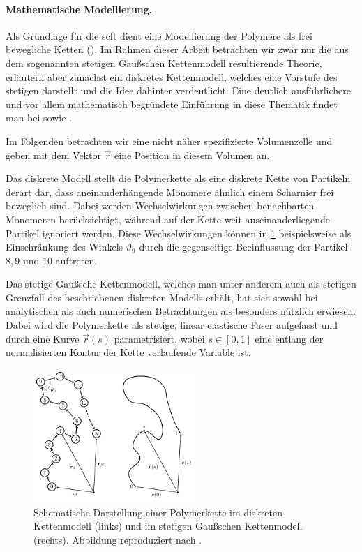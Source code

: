 \documentclass[../main.tex]{subfiles}
\begin{document}
\paragraph{Mathematische Modellierung.} %

Als Grundlage für die \acl{scft} dient eine Modellierung der Polymere als frei bewegliche Ketten ().
Im Rahmen dieser Arbeit betrachten wir zwar nur die aus dem sogenannten stetigen Gaußschen Kettenmodell resultierende Theorie, erläutern aber zunächst ein diskretes Kettenmodell, welches eine Vorstufe des stetigen darstellt und die Idee dahinter verdeutlicht.
Eine deutlich ausführlichere und vor allem mathematisch begründete Einführung in diese Thematik findet man bei \textcites[Chapter 2]{Fredrickson:2006th} sowie \textcite{rubinstein2003polymer}.

Im Folgenden betrachten wir eine nicht näher spezifizierte Volumenzelle und geben mit dem Vektor $\vec{r}$ eine Position in diesem Volumen an.

Das diskrete Modell stellt die Polymerkette als eine diskrete Kette von Partikeln derart dar, dass aneinanderhängende Monomere ähnlich einem Scharnier frei beweglich sind.
Dabei werden Wechselwirkungen zwischen benachbarten Monomeren berücksichtigt, während auf der Kette weit auseinanderliegende Partikel ignoriert werden.
Diese Wechselwirkungen können in \cref{figure:kettenmodelle} beispielsweise als Einschränkung des Winkels $\vartheta_9$ durch die gegenseitige Beeinflussung der Partikel $8, 9$ und $10$ auftreten.

Das stetige Gaußsche Kettenmodell, welches man unter anderem auch als stetigen Grenzfall des beschriebenen diskreten Modells erhält, hat sich sowohl bei analytischen als auch numerischen Betrachtungen als besonders nützlich erwiesen.
Dabei wird die Polymerkette als stetige, linear elastische Faser aufgefasst und durch eine Kurve $\vec{r}(s)$ parametrisiert, wobei $s \in [0, 1]$ eine entlang der normalisierten Kontur der Kette verlaufende Variable ist.

\begin{figure}
    \centering
        \includegraphics[width=0.55\textwidth]{figures/einleitung/chainmodell.pdf}
    \caption[%
        Polymerkette in diskretem und Gaußschen Kettenmodell.
    ]{%
        Schematische Darstellung einer Polymerkette im diskreten Kettenmodell (links) und im stetigen Gaußschen Kettenmodell (rechts).
        Abbildung reproduziert nach \cite[Figure 2.1 und 2.5]{Fredrickson:2006th}.
    }
    \label{figure:kettenmodelle}
\end{figure}
\end{document}
